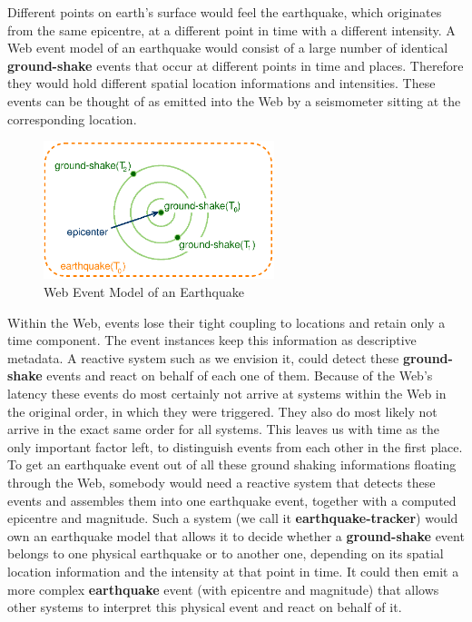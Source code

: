 



Different points on earth's surface would feel the earthquake, which originates from the same epicentre, at a different point in time with a different intensity.
A Web event model of an earthquake would consist of a large number of identical \textrm{\textbf{ground-shake}} events that occur at different points in time and places.
Therefore they would hold different spatial location informations and intensities.
These events can be thought of as emitted into the Web by a seismometer sitting at the corresponding location.
\begin{figure}[!ht]
  \centering
  \includegraphics[width=0.6\textwidth]{figures/Earthquake}
  \caption{Web Event Model of an Earthquake}
  \label{fig:Earthquake}
\end{figure}
Within the Web, events lose their tight coupling to locations and retain only a time component.
The event instances keep this information as descriptive metadata.
A reactive system such as we envision it, could detect these \textrm{\textbf{ground-shake}} events and react on behalf of each one of them.
Because of the Web's latency these events do most certainly not arrive at systems within the Web in the original order, in which they were triggered.
They also do most likely not arrive in the exact same order for all systems.
This leaves us with time as the only important factor left, to distinguish events from each other in the first place.
To get an earthquake event out of all these ground shaking informations floating through the Web, somebody would need a reactive system that detects these events and assembles them into one earthquake event, together with a computed epicentre and magnitude.
Such a system (we call it \textrm{\textbf{earthquake-tracker}}) would own an earthquake model that allows it to decide whether a \textrm{\textbf{ground-shake}} event belongs to one physical earthquake or to another one, depending on its spatial location information and the intensity at that point in time.
It could then emit a more complex \textrm{\textbf{earthquake}} event (with epicentre and magnitude) that allows other systems to interpret this physical event and react on behalf of it.


